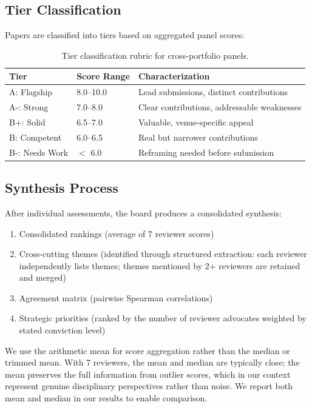 \subsection{Tier Classification}

Papers are classified into tiers based on aggregated panel scores:

\begin{table}[h]
\centering
\begin{tabular}{lll}
\toprule
Tier & Score Range & Characterization \\
\midrule
A: Flagship & 8.0--10.0 & Lead submissions, distinct contributions \\
A-: Strong & 7.0--8.0 & Clear contributions, addressable weaknesses \\
B+: Solid & 6.5--7.0 & Valuable, venue-specific appeal \\
B: Competent & 6.0--6.5 & Real but narrower contributions \\
B-: Needs Work & $<$ 6.0 & Reframing needed before submission \\
\bottomrule
\end{tabular}
\caption{Tier classification rubric for cross-portfolio panels.}
\end{table}

\subsection{Synthesis Process}

After individual assessments, the board produces a consolidated synthesis:
\begin{enumerate}
    \item Consolidated rankings (average of 7 reviewer scores)
    \item Cross-cutting themes (identified through structured extraction: each reviewer independently lists themes; themes mentioned by 2+ reviewers are retained and merged)
    \item Agreement matrix (pairwise Spearman correlations)
    \item Strategic priorities (ranked by the number of reviewer advocates weighted by stated conviction level)
\end{enumerate}

We use the arithmetic mean for score aggregation rather than the median or trimmed mean. With 7 reviewers, the mean and median are typically close; the mean preserves the full information from outlier scores, which in our context represent genuine disciplinary perspectives rather than noise. We report both mean and median in our results to enable comparison.

